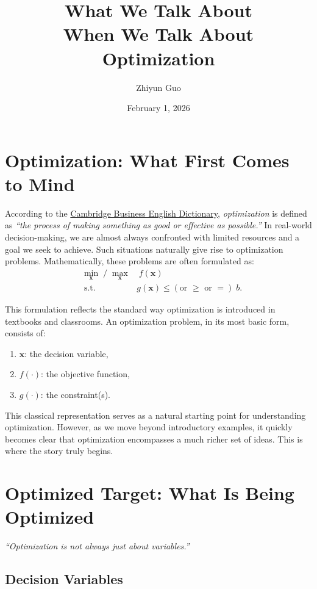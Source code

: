 \documentclass[11pt]{article}
\title{\textbf{\sffamily \Huge What We Talk About \\When We Talk About Optimization}}
\date{February 1, 2026}\fancyhead[R]{\sffamily\footnotesize What Is Optimization?}
\author{Zhiyun Guo}
\begin{document}
\maketitle
\section{Optimization: What First Comes to Mind}

According to the \href{https://dictionary.cambridge.org/us/dictionary/english/optimization}{Cambridge Business English Dictionary}, \textit{optimization} is defined as 
\textit{“the process of making something as good or effective as possible.”} 
In real-world decision-making, we are almost always confronted with limited resources and a goal we seek to achieve. 
Such situations naturally give rise to optimization problems. Mathematically, these problems are often formulated as:
\begin{align*}
    &\min_{\mathbf{x}} \;/\; \max_{\mathbf{x}} \quad f(\mathbf{x}) \\
    &\;\text{s.t.} \quad\quad\quad\quad\;\;\; g(\mathbf{x}) \leq (\text{or } \geq \text{ or } =) \; b .
\end{align*}

This formulation reflects the standard way optimization is introduced in textbooks and classrooms. 
An optimization problem, in its most basic form, consists of:
\begin{enumerate}
    \item $\mathbf{x}$: the decision variable,
    \item $f(\cdot)$: the objective function,
    \item $g(\cdot)$: the constraint(s).
\end{enumerate}

This classical representation serves as a natural starting point for understanding optimization. 
However, as we move beyond introductory examples, it quickly becomes clear that optimization encompasses a much richer set of ideas. 
This is where the story truly begins.
\section{Optimized Target: What Is Being Optimized}

\textit{“Optimization is not always just about variables.”}

\subsection{Decision Variables}
\end{document}
